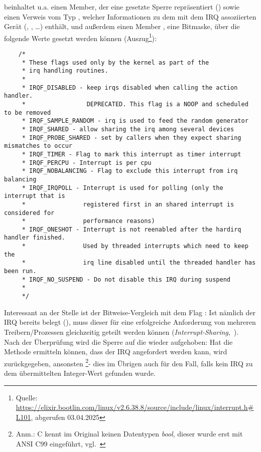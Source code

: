 \noindent
{} beinhaltet u.a. einen Member, der eine gesetzte Sperre repräsentiert () sowie einen Verweis  vom Typ , welcher Informationen zu dem mit dem IRQ assoziierten Gerät (, , \ldots) enthält, und außerdem einen Member , eine Bitmaske, über die folgende Werte gesetzt werden können (Auszug\footnote{
Quelle: \url{https://elixir.bootlin.com/linux/v2.6.38.8/source/include/linux/interrupt.h#L101}, abgerufen 03.04.2025
}):

\begin{verbatim}
    /*
     * These flags used only by the kernel as part of the
     * irq handling routines.
     *
     * IRQF_DISABLED - keep irqs disabled when calling the action handler.
     *                 DEPRECATED. This flag is a NOOP and scheduled to be removed
     * IRQF_SAMPLE_RANDOM - irq is used to feed the random generator
     * IRQF_SHARED - allow sharing the irq among several devices
     * IRQF_PROBE_SHARED - set by callers when they expect sharing mismatches to occur
     * IRQF_TIMER - Flag to mark this interrupt as timer interrupt
     * IRQF_PERCPU - Interrupt is per cpu
     * IRQF_NOBALANCING - Flag to exclude this interrupt from irq balancing
     * IRQF_IRQPOLL - Interrupt is used for polling (only the interrupt that is
     *                registered first in an shared interrupt is considered for
     *                performance reasons)
     * IRQF_ONESHOT - Interrupt is not reenabled after the hardirq handler finished.
     *                Used by threaded interrupts which need to keep the
     *                irq line disabled until the threaded handler has been run.
     * IRQF_NO_SUSPEND - Do not disable this IRQ during suspend
     *
     */
\end{verbatim}

\noindent
Interessant an der Stelle ist der Bitweise-Vergleich mit dem Flag : Ist nämlich der IRQ bereits belegt (), muss dieser für eine erfolgreiche Anforderung von mehreren Treibern/Prozessen gleichzeitig geteilt werden können (\textit{Interrupt-Sharing},~\cite[59]{Man20d}).\\

\noindent
Nach der Überprüfung wird die Sperre auf die  wieder aufgehoben: Hat die Methode ermitteln können, dass der IRQ angefordert werden kann, wird  zurückgegeben, ansonsten \footnote{
Anm.: C kennt im Original keinen Datentypen \textit{bool}, dieser wurde erst mit ANSI C99 eingeführt, vgl.~\cite[8]{ES3}
}- dies im Übrigen auch für den Fall, falls kein IRQ zu dem übermittelten Integer-Wert gefunden wurde.